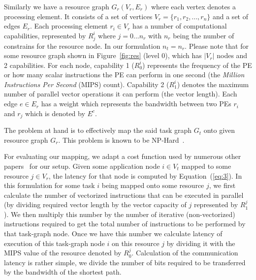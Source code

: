 \documentclass[10pt, conference, compsocconf]{IEEEtran}
\begin{document}
Similarly we have a resource graph $G_r(V_r, E_r)$ where each vertex
denotes a processing element. It consists of a set of vertices $V_r =
\{r_1, r_2, ... , r_n\}$ and a set of edges $E_r$. Each processing
element $r_i \in V_r$ has a number of computational capabilities,
represented by $R^{i}_{j}$ where $j=0...n_r$ with $n_r$ being the number
of constrains for the resource node. In our formulation $n_t = n_r$.
Please note that for some resource graph shown in Figure~\ref{fig:res}
(level 0), which has $|V_r|$ nodes and 2 capabilities. For each node,
capability 1 ($R^i_0$) represents the frequency of the PE or how many
scalar instructions the PE can perform in one second (the
\textit{Million Instructions Per Second} (MIPS) count). Capability 2
($R^i_1$) denotes the maximum number of parallel vector operations it
can perform (the vector length). Each edge $e \in E_r$ has a weight
which represents the bandwidth between two PEs $r_i$ and $r_j$ which is
denoted by $E^c$.


The problem at hand is to effectively map the said task graph $G_t$ onto
given resource graph $G_r$. This problem is known to be
NP-Hard~\cite{vsar89}. %

For evaluating our mapping, we adapt a cost function used by numerous
other papers~\cite{ssan05,ajai04,dajw12} for our setup.  Given some
application node $i \in V_t$ mapped to some resource $j \in V_r$, the
latency for that node is computed by Equation~(\ref{eq:3}). In this
formulation for some task $i$ being mapped onto some resource $j$, we
first calculate the number of vectorized instructions that can be
executed in parallel (by dividing required vector length by the vector
capacity of $j$ represented by $R^j_1$). We then multiply this number by
the number of iterative (non-vectorized) instructions required to get
the total number of instructions to be performed by that task-graph
node. Once we have this number we calculate latency of execution of this
task-graph node $i$ on this resource $j$ by dividing it with the MIPS
value of the resource denoted by $R^j_0$. Calculation of the
communication latency is rather simple, we divide the number of bits
required to be transferred by the bandwidth of the shortest path.
\end{document}
